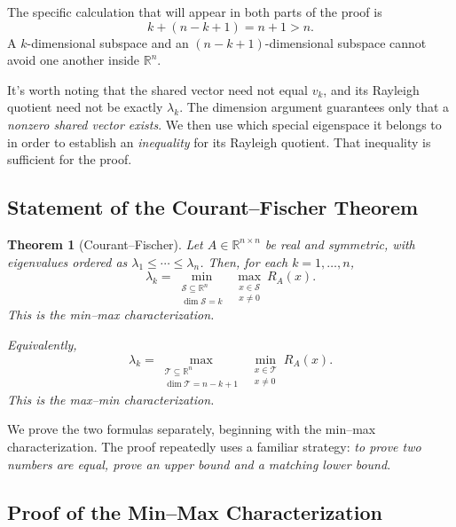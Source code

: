 \documentclass[14pt,letterpaper]{article}
\theoremstyle{plain}
\newtheorem{theorem}{Theorem}[section]
\theoremstyle{definition}
\theoremstyle{remark}
\newcommand{\R}{\mathbb{R}}
\begin{document}
The specific calculation that will appear in both
parts of the proof is
\[
\boxed{k+(n-k+1)=n+1>n.}
\]
A $k$-dimensional subspace and an
$(n-k+1)$-dimensional subspace cannot avoid
one another inside $\R^n$.


It's worth noting that the shared vector need not equal $v_k$, and its
Rayleigh quotient need not be exactly $\lambda_k$.
The dimension argument guarantees only that a
\emph{nonzero shared vector exists}. We then use
which special eigenspace it belongs to in order
to establish an \emph{inequality} for its
Rayleigh quotient. That inequality is sufficient
for the proof.


\subsection{Statement of the Courant--Fischer Theorem}
\label{subsec:courant_theorem}

\begin{theorem}[Courant--Fischer]
\label{thm:courant_fischer}
Let $A\in\R^{n\times n}$ be real and symmetric, with
eigenvalues ordered as
$\lambda_1\leq\cdots\leq\lambda_n$.
Then, for each $k=1,\ldots,n$,
\[
\boxed{
\lambda_k=
\min_{\substack{\mathcal S\subseteq\R^n\\
                 \dim\mathcal S=k}}
\ \max_{\substack{x\in\mathcal S\\x\neq0}}R_A(x).
}
\]
This is the \emph{min--max characterization}.

Equivalently,
\[
\boxed{
\lambda_k=
\max_{\substack{\mathcal T\subseteq\R^n\\
                 \dim\mathcal T=n-k+1}}
\ \min_{\substack{x\in\mathcal T\\x\neq0}}R_A(x).
}
\]
This is the \emph{max--min characterization}.
\end{theorem}

We prove the two formulas separately, beginning with
the min--max characterization. The proof repeatedly
uses a familiar strategy: \emph{to prove two numbers
are equal, prove an upper bound and a matching lower
bound}.

\subsection{Proof of the Min--Max Characterization}
\label{subsec:courant_minmax_proof}
\end{document}

